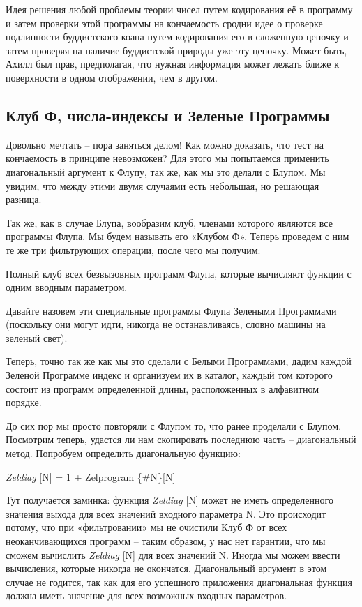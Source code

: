 \documentclass[../main.tex]{subfiles}
\begin{document}
Идея решения любой проблемы теории чисел путем кодирования её в программу и затем проверки этой программы на кончаемость сродни идее о проверке подлинности буддистского коана путем кодирования его в сложенную цепочку и затем проверяя на наличие буддистской природы уже эту цепочку. Может быть, Ахилл был прав, предполагая, что нужная информация может лежать ближе к поверхности в одном отображении, чем в другом.


\subsection{Клуб Ф, числа-индексы и Зеленые Программы}

Довольно мечтать \--- пора заняться делом! Как можно доказать, что тест на кончаемость в принципе невозможен? Для этого мы попытаемся применить диагональный аргумент к Флупу, так же, как мы это делали с Блупом. Мы увидим, что между этими двумя случаями есть небольшая, но решающая разница.

Так же, как в случае Блупа, вообразим клуб, членами которого являются все программы Флупа. Мы будем называть его «Клубом Ф». Теперь проведем с ним те же три фильтрующих операции, после чего мы получим:

Полный клуб всех безвызовных программ Флупа, которые вычисляют функции с одним вводным параметром.

Давайте назовем эти специальные программы Флупа Зелеными Программами (поскольку они могут идти, никогда не останавливаясь, словно машины на зеленый свет).

Теперь, точно так же как мы это сделали с Белыми Программами, дадим каждой Зеленой Программе индекс и организуем их в каталог, каждый том которого состоит из программ определенной длины, расположенных в алфавитном порядке.

До сих пор мы просто повторяли с Флупом то, что ранее проделали с Блупом. Посмотрим теперь, удастся ли нам скопировать последнюю часть \--- диагональный метод. Попробуем определить диагональную функцию:

\emph{Zeldiag} {[}N{]} = 1 + Zelprogram \{\#N\}{[}N{]}

Тут получается заминка: функция \emph{Zeldiag} {[}N{]} может не иметь определенного значения выхода для всех значений входного параметра N\@. Это происходит потому, что при «фильтровании» мы не очистили Клуб Ф от всех неоканчивающихся программ \--- таким образом, у нас нет гарантии, что мы сможем вычислить \emph{Zeldiag} {[}N{]} для всех значений N\@. Иногда мы можем ввести вычисления, которые никогда не окончатся. Диагональный аргумент в этом случае не годится, так как для его успешного приложения диагональная функция должна иметь значение для всех возможных входных параметров.
\end{document}
